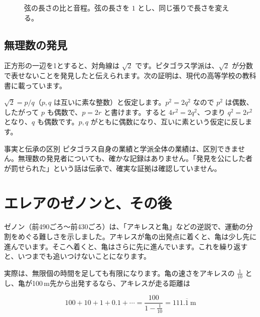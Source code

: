\documentclass[a4paper,11pt,openany]{ltjsbook}
\begin{document}
\begin{figure}[htbp]
\centering
{}
\caption{弦の長さの比と音程。弦の長さを $1$ とし、同じ張りで長さを変える。}
\end{figure}

\subsection{無理数の発見}

正方形の一辺を1とすると、対角線は $\sqrt2$ です。ピタゴラス学派は、$\sqrt2$ が分数で表せないことを発見したと伝えられます。次の証明は、現代の高等学校の教科書に載っています。

$\sqrt2=p/q$（$p,q$ は互いに素な整数）と仮定します。$p^2=2q^2$ なので $p^2$ は偶数、したがって $p$ も偶数で、$p=2r$ と書けます。すると $4r^2=2q^2$、つまり $q^2=2r^2$ となり、$q$ も偶数です。$p,q$ がともに偶数になり、互いに素という仮定に反します。

\begin{notebox}{事実と伝承の区別}
ピタゴラス自身の業績と学派全体の業績は、区別できません。無理数の発見者についても、確かな記録はありません。「発見を公にした者が罰せられた」という話は伝承で、確実な証拠は確認していません。
\end{notebox}

\section{エレアのゼノンと、その後}

ゼノン（前490ごろ〜前430ごろ）は、「アキレスと亀」などの逆説で、運動の分割をめぐる難しさを示しました。アキレスが亀の出発点に着くと、亀は少し先に進んでいます。そこへ着くと、亀はさらに先に進んでいます。これを繰り返すと、いつまでも追いつけないことになります。

実際は、無限個の時間を足しても有限になります。亀の速さをアキレスの $\tfrac1{10}$ とし、亀が100\,m先から出発するなら、アキレスが走る距離は

\[
100+10+1+0.1+\cdots=\frac{100}{1-\frac1{10}}=111.\overline{1}\ \text{m}
\]
\end{document}
